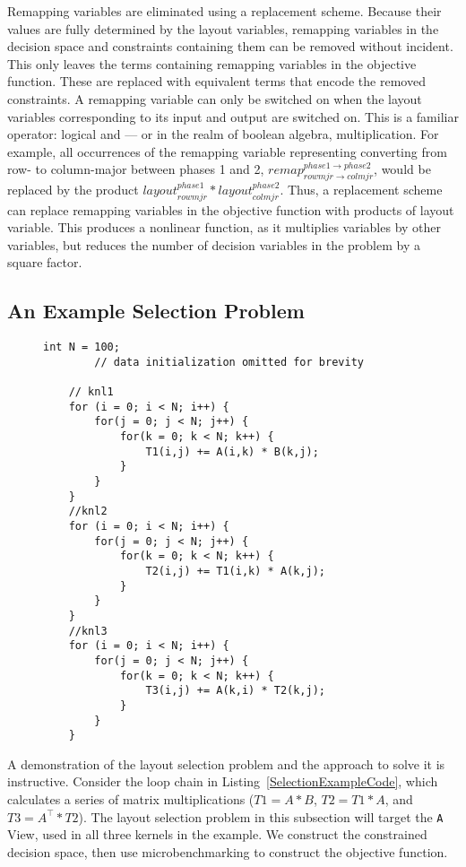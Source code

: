 Remapping variables are eliminated using a replacement scheme. 
Because their values are fully determined by the layout variables, remapping variables in the decision space and constraints containing them can be removed without incident.
This only leaves the terms containing remapping variables in the objective function.
These are replaced with equivalent terms that encode the removed constraints.
A remapping variable can only be switched on when the layout variables corresponding to its input and output are switched on.
This is a familiar operator: logical and --- or in the realm of boolean algebra, multiplication.
For example, all occurrences of the remapping variable representing converting from row- to column-major between phases 1 and 2, $remap_{rowmjr \rightarrow colmjr}^{phase1 \rightarrow phase2}$, would be replaced by the product $layout_{rowmjr}^{phase1} * layout_{colmjr}^{phase2}$.
Thus, a replacement scheme can replace remapping variables in the objective function with products of layout variable.
This produces a nonlinear function, as it multiplies variables by other variables, but reduces the number of decision variables in the problem by a square factor.

\subsection{An Example Selection Problem}\label{exampleSelectionSection}
\begin{figure}
	\begin{lstlisting}[caption={Example loop chain. The selection problem targets the \texttt{A} array. Code is shown using standard C++ for loops rather than RAJA kernels for the reader's familiarity. All data is assumed to be initialized to $N \times N$ in row-major layout.},label=SelectionExampleCode]
		int N = 100;
		// data initialization omitted for brevity
	
	// knl1
	for (i = 0; i < N; i++) {
		for(j = 0; j < N; j++) {
			for(k = 0; k < N; k++) {
				T1(i,j) += A(i,k) * B(k,j);
			}
		}
	}
	//knl2
	for (i = 0; i < N; i++) {
		for(j = 0; j < N; j++) {
			for(k = 0; k < N; k++) {
				T2(i,j) += T1(i,k) * A(k,j);
			}
		}
	}
	//knl3
	for (i = 0; i < N; i++) {
		for(j = 0; j < N; j++) {
			for(k = 0; k < N; k++) {
				T3(i,j) += A(k,i) * T2(k,j);
			}
		}
	}
\end{lstlisting}
\end{figure}

A demonstration of the layout selection problem and the approach to solve it is instructive.
Consider the loop chain in Listing~\ref{SelectionExampleCode}, which calculates a series of matrix multiplications ($T1 = A * B$, $T2 = T1 * A$, and $T3 = A^\top * T2$).
The layout selection problem in this subsection will target the \verb.A. View, used in all three kernels in the example.
We construct the constrained decision space, then use microbenchmarking to construct the objective function.

